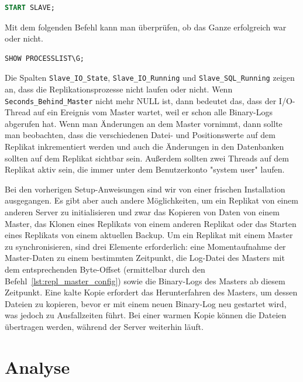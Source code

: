 \vspace{-5pt}
\begin{lstlisting}[language=SQL,caption=Starten der Replikation,label={lst:repl_replica_start}]
START SLAVE;
\end{lstlisting}
\vspace{-5pt}

Mit dem folgenden Befehl kann man überprüfen, ob das Ganze erfolgreich war oder nicht.

\vspace{-5pt}
\begin{lstlisting}[language=SQL,caption=Status der Replica,label={lst:repl_replica_status}]
SHOW PROCESSLIST\G;
\end{lstlisting}
\vspace{-5pt}

Die Spalten \texttt{Slave\_IO\_State}, \texttt{Slave\_IO\_Running} und \texttt{Slave\_SQL\_Running} zeigen an, dass die Replikationsprozesse nicht laufen oder nicht.
Wenn \texttt{Seconds\_Behind\_Master} nicht mehr NULL ist, dann bedeutet das, dass der I/O-Thread auf ein Ereignis vom Master wartet, weil er schon alle Binary-Logs abgerufen hat.
Wenn man Änderungen an dem Master vornimmt, dann sollte man beobachten, dass die verschiedenen Datei- und Positionswerte auf dem Replikat inkrementiert werden und auch die Änderungen in den Datenbanken sollten auf dem Replikat sichtbar sein.
Außerdem sollten zwei Threads auf dem Replikat aktiv sein, die immer unter dem Benutzerkonto "system user" laufen.

Bei den vorherigen Setup-Anweisungen sind wir von einer frischen Installation ausgegangen.
Es gibt aber auch andere Möglichkeiten, um ein Replikat von einem anderen Server zu initialisieren und zwar das Kopieren von Daten von einem Master, das Klonen eines Replikats von einem anderen Replikat oder das Starten eines Replikats von einem aktuellen Backup.
Um ein Replikat mit einem Master zu synchronisieren, sind drei Elemente erforderlich: eine Momentaufnahme der Master-Daten zu einem bestimmten Zeitpunkt, die Log-Datei des Masters mit dem entsprechenden Byte-Offset (ermittelbar durch den Befehl~\ref{lst:repl_master_config}) sowie die Binary-Logs des Masters ab diesem Zeitpunkt.
Eine kalte Kopie erfordert das Herunterfahren des Masters, um dessen Dateien zu kopieren, bevor er mit einem neuen Binary-Log neu gestartet wird, was jedoch zu Ausfallzeiten führt.
Bei einer warmen Kopie können die Dateien übertragen werden, während der Server weiterhin läuft.

\section{Analyse}\label{sec:replication-analyse}


